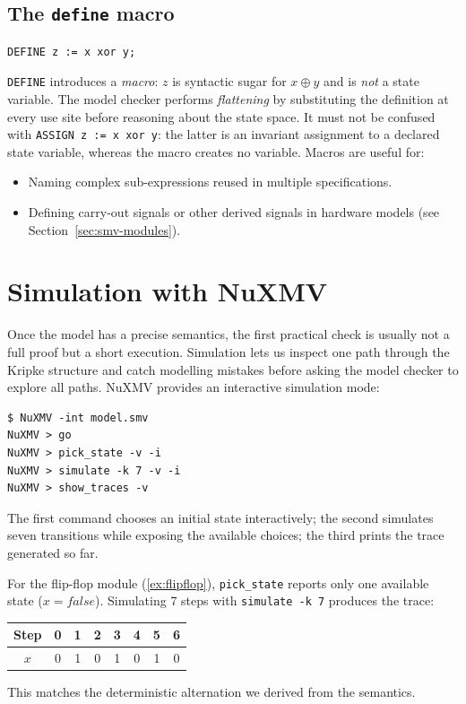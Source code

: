 \subsection{The \texttt{define} macro}
\label{sec:smv-define}

\begin{verbatim}
DEFINE z := x xor y;
\end{verbatim}

\texttt{DEFINE} introduces a \emph{macro}: $z$ is syntactic sugar for
$x \oplus y$ and is \emph{not} a state variable.  The model checker performs
\emph{flattening} by substituting the definition at every use site before
reasoning about the state space.  It must not be confused with
\texttt{ASSIGN z := x xor y}: the latter is an invariant assignment to a
declared state variable, whereas the macro creates no variable.  Macros are
useful for:
\begin{itemize}
  \item Naming complex sub-expressions reused in multiple specifications.
  \item Defining carry-out signals or other derived signals in hardware
        models (see Section~\ref{sec:smv-modules}).
\end{itemize}

\section{Simulation with NuXMV}
\label{sec:nuxmv-simulation}

Once the model has a precise semantics, the first practical check is usually
not a full proof but a short execution.  Simulation lets us inspect one path
through the Kripke structure and catch modelling mistakes before asking the
model checker to explore all paths.  NuXMV provides an interactive simulation
mode:

\begin{verbatim}
$ NuXMV -int model.smv
NuXMV > go
NuXMV > pick_state -v -i
NuXMV > simulate -k 7 -v -i
NuXMV > show_traces -v
\end{verbatim}
The first command chooses an initial state interactively; the second simulates
seven transitions while exposing the available choices; the third prints the
trace generated so far.

\begin{example}
\label{ex:nuxmv-flipflop}
For the flip-flop module (\cref{ex:flipflop}), \texttt{pick\_state}
reports only one available state ($x = \mathit{false}$).  Simulating 7
steps with \texttt{simulate -k 7} produces the trace:
\begin{center}
  \begin{tabular}{c|ccccccc}
    Step & 0 & 1 & 2 & 3 & 4 & 5 & 6 \\
    \hline
    $x$  & 0 & 1 & 0 & 1 & 0 & 1 & 0 \\
  \end{tabular}
\end{center}
This matches the deterministic alternation we derived from the semantics.
\end{example}

